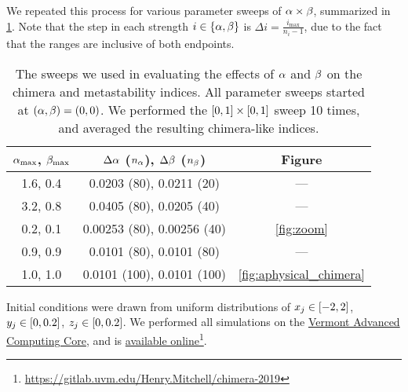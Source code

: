 We repeated this process for various parameter sweeps of $\alpha \times \beta$, summarized in \cref{tab:parameter_sweeps}.
Note that the step in each strength $i \in \Bqty{\hra, \hrb}$ is $\Delta i = \frac{i_{\text{max}}}{n_{i} - 1}$, due to the fact that the ranges are inclusive of both endpoints.
\begin{table}[ht]
  \centering
  \begin{tabular}{c | c | c}
    $\alpha_{\text{max}}$, $\beta_{\text{max}}$ & $\Delta \alpha$ ($n_{\alpha}$), $\Delta \beta$ ($n_{\beta}$) & Figure \\ \hline
    1.6, 0.4 & 0.0203 (80), 0.0211 (20) & --- \\
    3.2, 0.8 & 0.0405 (80), 0.0205 (40) & --- \\
    0.2, 0.1 & 0.00253 (80), 0.00256 (40) & \cref{fig:zoom} \\
    0.9, 0.9 & 0.0101 (80), 0.0101 (80) & --- \\
    1.0, 1.0 & 0.0101 (100), 0.0101 (100) & \cref{fig:aphysical_chimera}
  \end{tabular}
  \caption[Parameter sweeps]{The sweeps we used in evaluating the effects of $\alpha$ and $\beta$ on the chimera and metastability indices.
    All parameter sweeps started at $(\alpha, \beta) = (0, 0)$.
    We performed the $\bqty{0, 1} \times \bqty{0, 1}$ sweep 10 times, and averaged the resulting chimera-like indices.
  }
  \label{tab:parameter_sweeps}
\end{table}

Initial conditions were drawn from uniform distributions of $x_{j} \in \bqty{-2, 2}$, $y_{j} \in \bqty{0, 0.2}$, $z_{j} \in \bqty{0, 0.2}$.
We performed all simulations on the \href{https://www.uvm.edu/vacc}{Vermont Advanced Computing Core}, and is \href{https://gitlab.uvm.edu/Henry.Mitchell/chimera-2019}{available online}\footnote{\href{https://gitlab.uvm.edu/Henry.Mitchell/chimera-2019}{https://gitlab.uvm.edu/Henry.Mitchell/chimera-2019}}.

